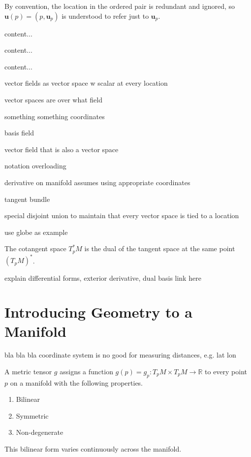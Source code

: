 By convention, the location in the ordered pair is redundant and ignored, so $\mathbf{u}(p) = (p, \mathbf{u}_{p})$ is understood to refer just to $\mathbf{u}_{p}$.

\begin{definition}[Differential]
	content...
\end{definition}

\begin{definition}
	content...
\end{definition}

\begin{definition}
	content...
\end{definition}

vector fields as vector space w scalar at every location

vector spaces are over what field

something something coordinates

basis field

vector field that is also a vector space

notation overloading

derivative on manifold assumes using appropriate coordinates

tangent bundle

special disjoint union to maintain that every vector space is tied to a location

use globe as example

\begin{definition}
	The cotangent space $T_{p}^{*} M$ is the dual of the tangent space at the same point $(T_{p} M)^{*}$.
\end{definition}

explain differential forms, exterior derivative, dual basis link here

\section{Introducing Geometry to a Manifold}

bla bla bla coordinate system is no good for measuring distances, e.g. lat lon

\begin{definition}
	A metric tensor $g$ assigns a function $g(p) = g_{p}: T_{p} M \times T_{p} M \rightarrow \mathbb{R}$ to every point $p$ on a manifold with the following properties.
	\begin{enumerate}
		\item Bilinear
		\item Symmetric
		\item Non-degenerate
	\end{enumerate}
	This bilinear form varies continuously across the manifold.
\end{definition}

